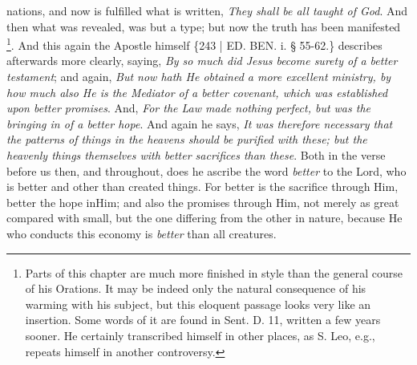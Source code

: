 nations, and now is fulfilled what is written, \emph{They shall be all
taught of God}. And then what was revealed, was but a type; but now
the truth has been manifested \footnote{Parts of this chapter are much more finished in style than the general
course of his Orations. It may be indeed only the natural consequence
of his warming with his subject, but this eloquent passage looks very
like an insertion. Some words of it are found in Sent. D. 11, written
a few years sooner. He certainly transcribed himself in other places,
as S. Leo, e.g., repeats himself in another controversy.}. And this again the Apostle himself \{243 | ED. BEN.
i. § 55-62.\} describes afterwards more clearly, saying, \emph{By so much
did Jesus become surety of a better testament}; and again, \emph{But
now hath He obtained a more excellent ministry, by how much also He is
the Mediator of a better covenant, which was established upon better
promises}. And, \emph{For the Law made nothing perfect, but was the
bringing in of a better hope}. And again he says, \emph{It was
therefore necessary that the patterns of things in the heavens should
be purified with these; but the heavenly things themselves with better
sacrifices than these}. Both in the verse before us then, and
throughout, does he ascribe the word \emph{better} to the Lord, who is
better and other than created things. For better is the sacrifice
through Him, better the hope in\emph{}Him; and also the promises
through Him, not merely as great compared with small, but the one
differing from the other in nature, because He who conducts this
economy is \emph{better} than all creatures.

